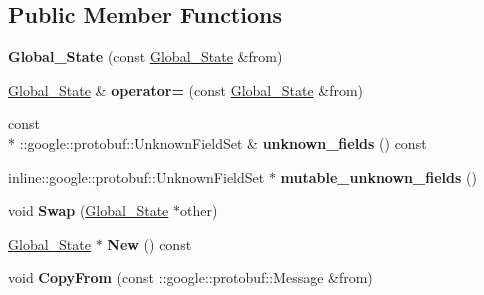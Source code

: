 \subsection*{Public Member Functions}
\begin{DoxyCompactItemize}
\item 
\hypertarget{classvss__state_1_1Global__State_a3a0a70c553656e9c3049308a9513e60c}{{\bfseries Global\-\_\-\-State} (const \hyperlink{classvss__state_1_1Global__State}{Global\-\_\-\-State} \&from)}\label{classvss__state_1_1Global__State_a3a0a70c553656e9c3049308a9513e60c}

\item 
\hypertarget{classvss__state_1_1Global__State_a01f51f37ae680992a1fd7b0aa3170af9}{\hyperlink{classvss__state_1_1Global__State}{Global\-\_\-\-State} \& {\bfseries operator=} (const \hyperlink{classvss__state_1_1Global__State}{Global\-\_\-\-State} \&from)}\label{classvss__state_1_1Global__State_a01f51f37ae680992a1fd7b0aa3170af9}

\item 
\hypertarget{classvss__state_1_1Global__State_ad315f5c8ac8db0801d1f554b0f5220e9}{const \\*
\-::google\-::protobuf\-::\-Unknown\-Field\-Set \& {\bfseries unknown\-\_\-fields} () const }\label{classvss__state_1_1Global__State_ad315f5c8ac8db0801d1f554b0f5220e9}

\item 
\hypertarget{classvss__state_1_1Global__State_a4dbf780222435e650455d532b81dca44}{inline\-::google\-::protobuf\-::\-Unknown\-Field\-Set $\ast$ {\bfseries mutable\-\_\-unknown\-\_\-fields} ()}\label{classvss__state_1_1Global__State_a4dbf780222435e650455d532b81dca44}

\item 
\hypertarget{classvss__state_1_1Global__State_a2b83b57b8673e15692526e3c4ccccc94}{void {\bfseries Swap} (\hyperlink{classvss__state_1_1Global__State}{Global\-\_\-\-State} $\ast$other)}\label{classvss__state_1_1Global__State_a2b83b57b8673e15692526e3c4ccccc94}

\item 
\hypertarget{classvss__state_1_1Global__State_a478df1a0909f344142b866def70f04f1}{\hyperlink{classvss__state_1_1Global__State}{Global\-\_\-\-State} $\ast$ {\bfseries New} () const }\label{classvss__state_1_1Global__State_a478df1a0909f344142b866def70f04f1}

\item 
\hypertarget{classvss__state_1_1Global__State_a5a57651faea985db08eafee9429407d0}{void {\bfseries Copy\-From} (const \-::google\-::protobuf\-::\-Message \&from)}\label{classvss__state_1_1Global__State_a5a57651faea985db08eafee9429407d0}


\end{DoxyCompactItemize}
